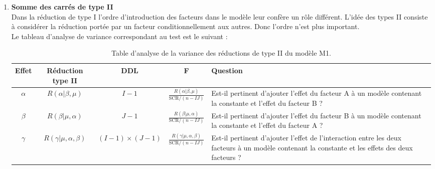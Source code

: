 \documentclass[12pt,a4paper]{report}
\begin{document}
\begin{enumerate}[label=\alph*)]
		\item \textbf{Somme des carrés de type II}\\
		Dans la réduction de type I l'ordre d'introduction des facteurs dans le modèle leur confère un rôle différent. L'idée des types II consiste à considérer la réduction portée par un facteur conditionnellement aux autres. Donc l'ordre n'est plus important.\\
		Le tableau d'analyse de variance correspondant au test est le suivant : 
		\begin{table}[H]
			\centering
			\begin{adjustbox}{width=\textwidth}
				\begin{tabular}{|c|c|c|c|p{8cm}|}
					\hline
					\textbf{Effet} & \textbf{Réduction type II} & \textbf{DDL} & \textbf{F} & \textbf{Question} \\ \hline
					$\alpha$ & $R(\alpha|\beta, \mu)$ & $I-1$ & $\frac{R(\alpha|\beta, \mu)}{\text{SCR} / (n - IJ)}$ & Est-il pertinent d'ajouter l'effet du facteur A à un modèle contenant la constante et l'effet du facteur B ? \\ \hline
					$\beta$ & $R(\beta|\mu, \alpha)$ & $J-1$ & $\frac{R(\beta|\mu, \alpha)}{\text{SCR} / (n - IJ)}$ & Est-il pertinent d'ajouter l'effet du facteur B à un modèle contenant la constante et l'effet du facteur A ? \\ \hline
					$\gamma$ & $R(\gamma|\mu, \alpha, \beta)$ & $(I-1) \times (J-1)$ & $\frac{R(\gamma|\mu, \alpha, \beta)}{\text{SCR} / (n - IJ)}$ & Est-il pertinent d'ajouter l'effet de l'interaction entre les deux facteurs à un modèle contenant la constante et les effets des deux facteurs ? \\ \hline
				\end{tabular}
			\end{adjustbox}
			\caption{Table d'analyse de la variance des réductions de type II du modèle M1.}
		\end{table}
		

\end{enumerate}
\end{document}
